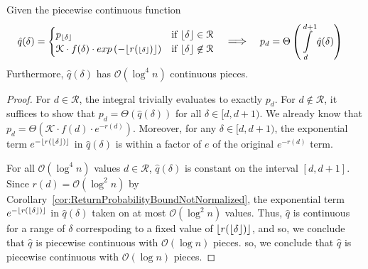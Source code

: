 \begin{lemma}
\label{lem:ReturnProbabilityPiecewiseContinuous}
Given the piecewise continuous function
\begin{align*}
    \hat q(\delta) &=
    \begin{cases}
        p_{\floor\delta} &\mbox{if } \floor\delta \in \mathcal R \\ 
        \mathcal K\cdot f(\delta)\cdot exp\left(-\lfloor{r({\scriptstyle\floor\delta})}\rfloor\right)
        & \mbox{if } \floor\delta \not\in \mathcal R
    \end{cases}
    && \mathlarger \implies
    && p_d = \Theta\left( \int\limits_d^{d+1} \hat q(\delta)\right)
\end{align*}
Furthermore, $\hat q(\delta)$ has $\mathcal O(\log^4 n)$ continuous pieces.
\end{lemma}
\begin{proof}
For $d \in \mathcal R$, the integral trivially evaluates to exactly $p_d$.
For $d\not\in \mathcal R$, it suffices to show that $p_d = \Theta\left( \hat q(\delta)\right)$ for all $\delta\in [d,d+1)$.
We already know that $p_d = \Theta\left( \mathcal K\cdot f(d)\cdot e^{-r(d)}\right)$.
Moreover, for any $\delta\in [d,d+1)$, the exponential term $e^{-\lfloor r(\lfloor\delta\rfloor)\rfloor}$ in $\hat q(\delta)$ is within a factor of $e$ of the original $e^{-r(d)}$ term.

For all $\mathcal O(\log^4 n)$ values $d\in \mathcal R$, $\hat q(\delta)$ is constant on the interval $[d,d+1]$.
Since $r(d) = \mathcal O(\log^2 n)$ by Corollary~\ref{cor:ReturnProbabilityBoundNotNormalized},
the exponential term $e^{-\lfloor r(\lfloor\delta\rfloor)\rfloor}$ in $\hat q(\delta)$ taken on at most $\mathcal O(\log^2 n)$ values.
Thus, $\hat q$ is continuous for a range of $\delta$ correspoding to a fixed value of $\lfloor r(\lfloor\delta\rfloor)\rfloor$,
and so, we conclude that $\hat q$ is piecewise continuous with $\mathcal O(\log n)$ pieces.
so, we conclude that $\hat q$ is piecewise continuous with $\mathcal O(\log n)$ pieces.
\end{proof}

